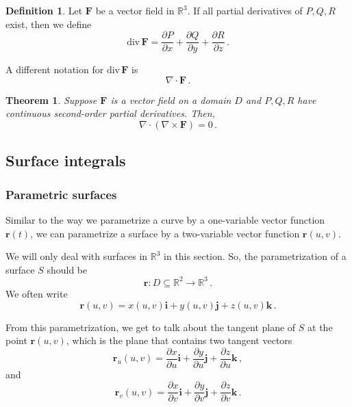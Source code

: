 \documentclass[
]{article}
\newtheorem{theorem}{Theorem}[section]
\theoremstyle{definition}
\newtheorem{definition}{Definition}[section]
\theoremstyle{definition}
\theoremstyle{definition}
\theoremstyle{definition}
\theoremstyle{remark}
\begin{document}
\begin{definition}
Let \(\mathbf{F}\) be a vector field in \(\mathbb{R}^3\).
If all partial derivatives of \(P,Q,R\) exist, then we define
\begin{equation*}
    \mathrm{div}\,\mathbf{F} =  
    \frac{\partial P}{\partial x} + \frac{\partial Q}{\partial y} + \frac{\partial R}{\partial z} \,.
\end{equation*}
\end{definition}

A different notation for \(\mathrm{div} \, \mathbf{F}\) is
\begin{equation*}
    \nabla \cdot \mathbf{F} \,.
\end{equation*}

\begin{theorem}
Suppose \(\mathbf{F}\) is a vector field on a domain \(D\) and \(P,Q,R\) have continuous
second-order partial derivatives.
Then,
\begin{equation*}
    \nabla \cdot (\nabla \times \mathbf{F}) = 0 \,.
\end{equation*}
\end{theorem}

\subsection{Surface integrals}\label{surface-integrals}

\subsubsection{Parametric surfaces}\label{parametric-surfaces}

Similar to the way we parametrize a curve by a one-variable vector function
\(\mathbf{r}(t)\), we can parametrize a surface by a two-variable vector function
\(\mathbf{r}(u,v)\).

We will only deal with surfaces in \(\mathbb{R}^3\) in this section. So, the parametrization
of a surface \(S\)
should be
\begin{equation*}
\mathbf{r}: D\subseteq \mathbb{R}^2 \to \mathbb{R}^3 \,.
\end{equation*}
We often write
\begin{equation*}
    \mathbf{r}(u,v) = x(u,v) \mathbf{i} + y(u,v) \mathbf{j} + z(u,v) \mathbf{k} \,.
\end{equation*}

From this parametrization,
we get to talk about the tangent plane of \(S\) at the point \(\mathbf{r}(u,v)\),
which is the plane that contains two tangent vectors
\begin{equation*}
    \mathbf{r}_u (u,v) = \frac{\partial x}{\partial u} \mathbf{i} +  \frac{\partial y}{\partial u} \mathbf{j} 
                            + \frac{\partial z}{\partial u} \mathbf{k} \,,
\end{equation*}
and
\begin{equation*}
    \mathbf{r}_v (u,v) = \frac{\partial x}{\partial v} \mathbf{i} +  \frac{\partial y}{\partial v} \mathbf{j} 
                            + \frac{\partial z}{\partial v} \mathbf{k} \,.
\end{equation*}
\end{document}
